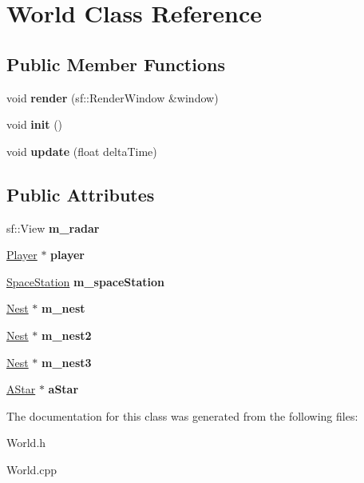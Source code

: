 \hypertarget{class_world}{}\section{World Class Reference}
\label{class_world}
\subsection*{Public Member Functions}
\begin{DoxyCompactItemize}
\item 
\mbox{\label{class_world_a6be69ff54f7f29713c0954cabe34aecc}} 
void {\bfseries render} (sf\+::\+Render\+Window \&window)
\item 
\mbox{\label{class_world_a0150607a49c2400d5c848159dd02d533}} 
void {\bfseries init} ()
\item 
\mbox{\label{class_world_a6f861499defce9ddb7f660e4c7f4a194}} 
void {\bfseries update} (float delta\+Time)
\end{DoxyCompactItemize}
\subsection*{Public Attributes}
\begin{DoxyCompactItemize}
\item 
\mbox{\label{class_world_a15cab1c818f25a605c8379983618a5fe}} 
sf\+::\+View {\bfseries m\+\_\+radar}
\item 
\mbox{\label{class_world_addf54f12f3a1e9c8f120265bafa3474e}} 
\mbox{\hyperlink{class_player}{Player}} $\ast$ {\bfseries player}
\item 
\mbox{\label{class_world_a7ad719bc4a4c234d4610a9657f1ecb30}} 
\mbox{\hyperlink{class_space_station}{Space\+Station}} {\bfseries m\+\_\+space\+Station}
\item 
\mbox{\label{class_world_a666d6636240895d601d85f4ca15df01b}} 
\mbox{\hyperlink{class_nest}{Nest}} $\ast$ {\bfseries m\+\_\+nest}
\item 
\mbox{\label{class_world_ad87050cff8d746edba3b7be07a9b764e}} 
\mbox{\hyperlink{class_nest}{Nest}} $\ast$ {\bfseries m\+\_\+nest2}
\item 
\mbox{\label{class_world_a2d978612cb7f10e3b66f89e0fcfa9c6a}} 
\mbox{\hyperlink{class_nest}{Nest}} $\ast$ {\bfseries m\+\_\+nest3}
\item 
\mbox{\label{class_world_a0f09ef171e221568a0428ef3fdefbbb2}} 
\mbox{\hyperlink{class_a_star}{A\+Star}} $\ast$ {\bfseries a\+Star}
\end{DoxyCompactItemize}


The documentation for this class was generated from the following files\+:\begin{DoxyCompactItemize}
\item 
World.\+h\item 
World.\+cpp\end{DoxyCompactItemize}
